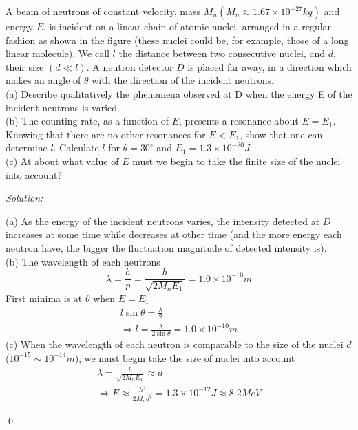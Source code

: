 \documentclass[12pt]{article}
\newenvironment{problem}[2][Problem]{\begin{trivlist}
\item[\hskip \labelsep {\bfseries #1}\hskip \labelsep {\bfseries #2.}]}{\end{trivlist}}
\newenvironment{sol}
    {\emph{Solution:}
    }
    {
    \qed
    }
\begin{document}
\begin{problem}{3}
A beam of neutrons of constant velocity, mass $M_n(M_n\approx1.67\times10^{-27}kg)$ and energy $E$, is incident on a linear chain of atomic nuclei, arranged in a regular fashion as shown in the figure (these nuclei could be, for example, those of a long linear molecule). We call $l$ the distance between two consecutive nuclei, and $d$, their size $(d\ll l)$. A neutron detector $D$ is placed far away, in a direction which makes an angle of $\theta$ with the direction of the incident neutrons.\\
(a) Describe qualitatively the phenomena observed at D when the energy E of the incident neutrons is varied.\\
(b)  The counting rate, as a function of $E$, presents a resonance about $E=E_1$. Knowing that there are no other resonances for $E<E_1$, show that one can determine $l$. Calculate $l$ for $\theta=30^{\circ}$ and $E_1=1.3\times10^{-20}J$.\\
(c) At about what value of $E$ must we begin to take the finite size of the nuclei into account?
\end{problem}
\begin{sol}
(a) As the energy of the incident neutrons varies, the intensity detected at $D$ increases at some time while decreases at other time (and the more energy each neutron have, the bigger the fluctuation magnitude of detected intensity is).\\
(b) The wavelength of each neutrons
\begin{equation}
\lambda=\frac{h}{p}=\frac{h}{\sqrt{2M_nE_1}}=1.0\times10^{-10}m
\end{equation}
First minima is at $\theta$ when $E=E_1$
\begin{gather}
l\sin\theta=\frac{\lambda}{2}\\
\Longrightarrow l=\frac{\lambda}{2\sin\theta}=1.0\times10^{-10}m
\end{gather}
(c) When the wavelength of each neutron is comparable to the size of the nuclei $d$ ($10^{-15}\sim10^{-14}m$), we must begin take the size of nuclei into account
\begin{gather}
\lambda=\frac{h}{\sqrt{2M_nE_1}}\approx d\\
\Longrightarrow E\approx\frac{h^2}{2M_nd^2}=1.3\times10^{-12}J\approx8.2MeV
\end{gather}
\end{sol}
\end{document}
